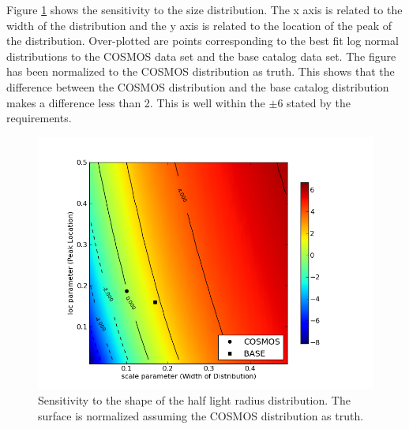 \documentclass[]{article}
\begin{document}
{Figure \ref{fig:size_sens} shows the sensitivity to the size distribution.  The x axis is related to the width of the 
distribution and the y axis is related to the location of the peak of the distribution. Over-plotted are points corresponding
to the best fit log normal distributions to the COSMOS data set and the base catalog data set.  The figure has been
normalized to the COSMOS distribution as truth.  This shows that the difference between the COSMOS distribution and
the base catalog distribution makes a difference less than 2.  This is well within the $\pm6$ stated by the requirements.
\begin{figure}[H]
\centering
\includegraphics[width=5in]{validation_figures/size_sensitivity.png}
\caption{Sensitivity to the shape of the half light radius distribution.  The surface is normalized assuming the COSMOS distribution as truth.\label{fig:size_sens}}
\end{figure}


}
\end{document}
